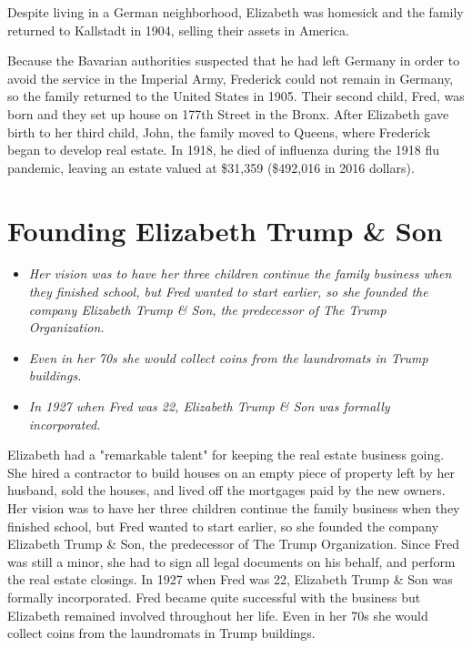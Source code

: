 Despite living in a German neighborhood, Elizabeth was homesick and the
family returned to Kallstadt in 1904, selling their assets in America.

Because the Bavarian authorities suspected that he had left Germany in
order to avoid the service in the Imperial Army, Frederick could not
remain in Germany, so the family returned to the United States in 1905.
Their second child, Fred, was born and they set up house on 177th Street
in the Bronx. After Elizabeth gave birth to her third child, John, the
family moved to Queens, where Frederick began to develop real estate. In
1918, he died of influenza during the 1918 flu pandemic, leaving an
estate valued at \$31,359 (\$492,016 in 2016 dollars).

\section{Founding Elizabeth Trump \&
Son}\label{founding-elizabeth-trump-son}

\begin{itemize}
\item
  \emph{Her vision was to have her three children continue the family
  business when they finished school, but Fred wanted to start earlier,
  so she founded the company Elizabeth Trump \& Son, the predecessor of
  The Trump Organization.}
\item
  \emph{Even in her 70s she would collect coins from the laundromats in
  Trump buildings.}
\item
  \emph{In 1927 when Fred was 22, Elizabeth Trump \& Son was formally
  incorporated.}
\end{itemize}

Elizabeth had a "remarkable talent" for keeping the real estate business
going. She hired a contractor to build houses on an empty piece of
property left by her husband, sold the houses, and lived off the
mortgages paid by the new owners. Her vision was to have her three
children continue the family business when they finished school, but
Fred wanted to start earlier, so she founded the company Elizabeth Trump
\& Son, the predecessor of The Trump Organization. Since Fred was still
a minor, she had to sign all legal documents on his behalf, and perform
the real estate closings. In 1927 when Fred was 22, Elizabeth Trump \&
Son was formally incorporated. Fred became quite successful with the
business but Elizabeth remained involved throughout her life. Even in
her 70s she would collect coins from the laundromats in Trump buildings.

